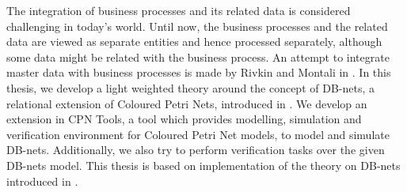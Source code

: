 \abstract

The integration of business processes and its related data is considered challenging in today's world. Until now, the business processes and the related data are viewed as separate entities and hence processed separately, although some data might be related with the business process. An attempt to integrate master data with business processes is made by Rivkin and Montali in \cite{DBLP:journals/corr/DBNets}. In this thesis, we develop a light weighted theory around the concept of DB-nets, a relational extension of Coloured Petri Nets, introduced in \cite{DBLP:journals/corr/DBNets}. We develop an extension in CPN Tools, a tool which provides modelling, simulation and verification environment for Coloured Petri Net models, to model and simulate DB-nets. Additionally, we also try to perform verification tasks over the given DB-nets model. This thesis is based on implementation of the theory on DB-nets introduced in \cite{DBLP:journals/corr/DBNets}.


